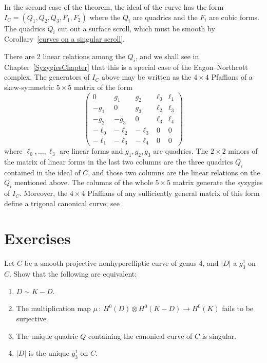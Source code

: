 \begin{fact}
In the second case of the theorem, the ideal of the curve has the form $I_C = (Q_1, Q_2, Q_3, F_1, F_2)$
where the $Q_i$ are quadrics and the $F_i$ are cubic forms.
The quadrics $Q_i$ cut out a surface
scroll,
%
which
must be smooth by Corollary~\ref{curves on a singular scroll}.

There are 2 linear relations among the
$Q_i$, and we shall see in Chapter~\ref{SyzygiesChapter}
that this is a special case of the
Eagon--Northcott complex.
%
The generators of $I_C$ above may be written as the $4\times 4$
Pfaffians
%
of a skew-symmetric $5\times 5$ matrix of the form
$$
\begin{pmatrix}
0&g_1&g_2&\ell_0&\ell_1\\
-g_1&0&g_3&\ell_2&\ell_3\\
-g_2&-g_3&0 &\ell_3&\ell_4\\
-\ell_0&-\ell_2&-\ell_3&0&0\\
-\ell_1&-\ell_3&-\ell_4&0&0
\end{pmatrix}
$$
where $\ell_0,\dots,\ell_3$ are linear forms and $g_1, g_2, g_3$ are quadrics. The
 $2\times 2$
minors of the matrix of linear forms in the last two columns are the three quadrics $Q_i$ contained in the ideal
of $C$, and those two columns are the linear relations on the $Q_i$ mentioned above.
The columns of the whole $5\times 5$ matrix generate the syzygies of $I_C$. Moreover, the
$4\times 4$ Pfaffians of any sufficiently general matrix of this form define a
trigonal canonical curve;
%
see \cite{MR453723}.
%
\end{fact}

\section{Exercises}

\begin{exercise} \label{ex7.1}
Let $C$ be a smooth projective nonhyperelliptic
curve of genus 4,
%
and $|D|$ a $g^1_3$ on $C$. Show that the following are equivalent:
\begin{enumerate}
\item $D \sim K-D$.
\item The multiplication map $\mu \,{:}\, H^0(D) \otimes H^0(K-D) \to H^0(K)$ fails to be sur\-jec\-tive.
\item The unique quadric $Q$ containing the canonical curve of $C$ is singular.
\item $|D|$ is the unique $g^1_3$ on $C$.
\end{enumerate}\label{tnih9.1}
\end{exercise}

